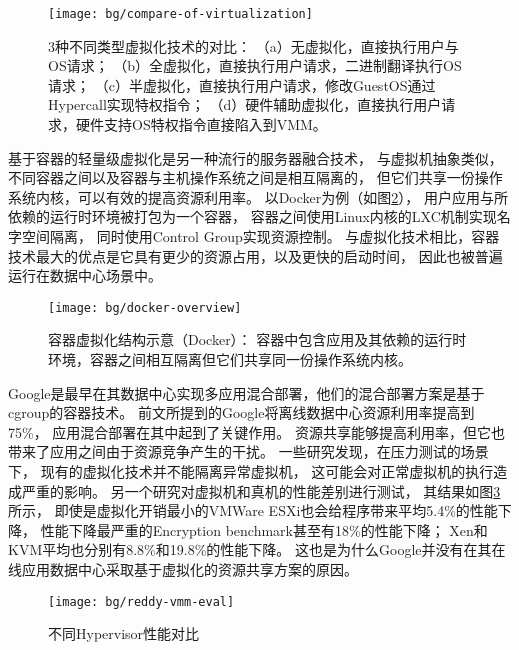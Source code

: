 \begin{figure}[t]
  \centering
  \texttt{[image: bg/compare-of-virtualization]}
  \caption[3种不同类型虚拟化技术的对比]{3种不同类型虚拟化技术的对比：
    （a）无虚拟化，直接执行用户与OS请求；
    （b）全虚拟化，直接执行用户请求，二进制翻译执行OS请求；
    （c）半虚拟化，直接执行用户请求，修改GuestOS通过Hypercall实现特权指令；
    （d）硬件辅助虚拟化，直接执行用户请求，硬件支持OS特权指令直接陷入到VMM。}
  \label{fig:compare-of-virt}
\end{figure}

基于容器的轻量级虚拟化是另一种流行的服务器融合技术，
与虚拟机抽象类似，不同容器之间以及容器与主机操作系统之间是相互隔离的，
但它们共享一份操作系统内核，可以有效的提高资源利用率。
以Docker为例（如图\ref{fig:docker-overview}），
用户应用与所依赖的运行时环境被打包为一个容器，
容器之间使用Linux内核的LXC\cite{lxc}机制实现名字空间隔离，
同时使用Control Group\cite{cgroup}实现资源控制。
与虚拟化技术相比，容器技术最大的优点是它具有更少的资源占用，以及更快的启动时间，
因此也被普遍运行在数据中心场景中。

\begin{figure}[htb]
  \centering
  \begin{minipage}{0.75\textwidth}
    \texttt{[image: bg/docker-overview]}
    \caption[容器虚拟化结构示意（Docker）]{容器虚拟化结构示意（Docker）：
      容器中包含应用及其依赖的运行时环境，容器之间相互隔离但它们共享同一份操作系统内核。}
    \label{fig:docker-overview}
  \end{minipage}
\end{figure}


Google是最早在其数据中心实现多应用混合部署，他们的混合部署方案是基于cgroup的容器技术。
前文所提到的Google将离线数据中心资源利用率提高到75\%，
应用混合部署在其中起到了关键作用。
资源共享能够提高利用率，但它也带来了应用之间由于资源竞争产生的干扰。
一些研究发现，在压力测试的场景下，
现有的虚拟化技术并不能隔离异常虚拟机\cite{Matthews:2007}，
这可能会对正常虚拟机的执行造成严重的影响。
另一个研究\cite{Reddy:2014}对虚拟机和真机的性能差别进行测试，
其结果如图\ref{fig:reddy-vmm-eval}所示，
即使是虚拟化开销最小的VMWare ESXi也会给程序带来平均5.4\%的性能下降，
性能下降最严重的Encryption benchmark甚至有18\%的性能下降；
Xen和KVM平均也分别有8.8\%和19.8\%的性能下降。
这也是为什么Google并没有在其在线应用数据中心采取基于虚拟化的资源共享方案的原因。

\begin{figure}[tb]
  \centering
  \texttt{[image: bg/reddy-vmm-eval]}
  \caption[不同Hypervisor性能对比]{不同Hypervisor性能对比\cite{Reddy:2014}}
  \label{fig:reddy-vmm-eval}
\end{figure}


